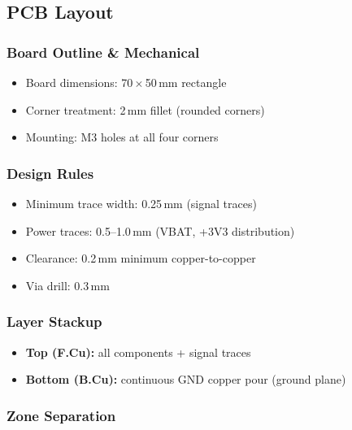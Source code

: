 \subsection{PCB Layout}

\subsubsection{Board Outline \& Mechanical}

\begin{itemize}[leftmargin=1.8em, itemsep=2pt]
  \item Board dimensions: 70\,$\times$\,50\,mm rectangle
  \item Corner treatment: 2\,mm fillet (rounded corners)
  \item Mounting: M3 holes at all four corners
\end{itemize}

\subsubsection{Design Rules}

\begin{itemize}[leftmargin=1.8em, itemsep=2pt]
  \item Minimum trace width: 0.25\,mm (signal traces)
  \item Power traces: 0.5–1.0\,mm (VBAT, +3V3 distribution)
  \item Clearance: 0.2\,mm minimum copper-to-copper
  \item Via drill: 0.3\,mm
\end{itemize}

\subsubsection{Layer Stackup}

\begin{itemize}[leftmargin=1.8em, itemsep=2pt]
  \item \textbf{Top (F.Cu):} all components + signal traces
  \item \textbf{Bottom (B.Cu):} continuous GND copper pour (ground plane)
\end{itemize}

\subsubsection{Zone Separation}

